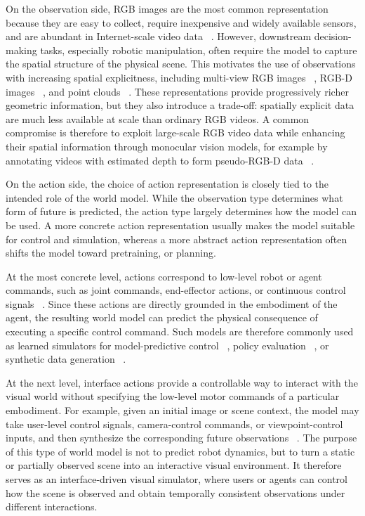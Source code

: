 On the observation side, RGB images are the most common representation because they are easy to collect, require inexpensive and widely available sensors, and are abundant in Internet-scale video data ~\cite{gpc,dreamdojo,genie3,lingbot-world,rtfm,adaworld,cosmos,unipi,avdc,susie,v2a}. 
However, downstream decision-making tasks, especially robotic manipulation, often require the model to capture the spatial structure of the physical scene. 
This motivates the use of observations with increasing spatial explicitness, including multi-view RGB images ~\cite{ctrl-world,enerverse,vidar}, RGB-D images ~\cite{flowdreamer,roboscape,tesseract,clover, gvftape}, and point clouds ~\cite{particleformer,pointworld}. 
These representations provide progressively richer geometric information, but they also introduce a trade-off: spatially explicit data are much less available at scale than ordinary RGB videos. 
A common compromise is therefore to exploit large-scale RGB video data while enhancing their spatial information through monocular vision models, for example by annotating videos with estimated depth to form pseudo-RGB-D data ~\cite{flowdreamer, roboscape, tesseract, gvftape}.

On the action side, the choice of action representation is closely tied to the intended role of the world model. 
While the observation type determines what form of future is predicted, the action type largely determines how the model can be used. 
A more concrete action representation usually makes the model suitable for control and simulation, whereas a more abstract action representation often shifts the model toward pretraining, or planning.

At the most concrete level, actions correspond to low-level robot or agent commands, such as joint commands, end-effector actions, or continuous control signals ~\cite{particleformer, pointworld, flowdreamer, roboscape, ctrl-world, gpc, dreamdojo}. 
Since these actions are directly grounded in the embodiment of the agent, the resulting world model can predict the physical consequence of executing a specific control command. 
Such models are therefore commonly used as learned simulators for model-predictive control ~\cite{pointworld, particleformer,flowdreamer,gpc}, policy evaluation ~\cite{ctrl-world, roboscape}, or synthetic data generation ~\cite{ctrl-world, roboscape}.

At the next level, interface actions provide a controllable way to interact with the visual world without specifying the low-level motor commands of a particular embodiment. 
For example, given an initial image or scene context, the model may take user-level control signals, camera-control commands, or viewpoint-control inputs, and then synthesize the corresponding future observations ~\cite{genie3, lingbot-world, rtfm}. 
The purpose of this type of world model is not to predict robot dynamics, but to turn a static or partially observed scene into an interactive visual environment. 
It therefore serves as an interface-driven visual simulator, where users or agents can control how the scene is observed and obtain temporally consistent observations under different interactions.

